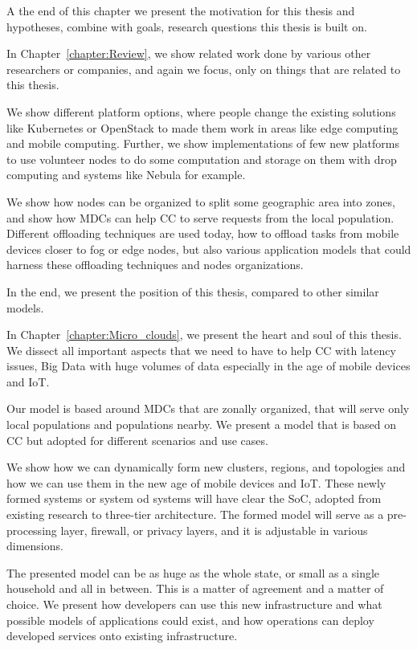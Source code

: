A the end of this chapter we present the motivation for this thesis and hypotheses, combine with goals, research questions this thesis is built on.

In Chapter~\ref{chapter:Review}, we show related work done by various other researchers or companies, and again we focus, only on things that are related to this thesis.

We show different platform options, where people change the existing solutions like Kubernetes or OpenStack to made them work in areas like edge computing and mobile computing. Further, we show implementations of few new platforms to use volunteer nodes to do some computation and storage on them with drop computing and systems like Nebula for example.

We show how nodes can be organized to split some geographic area into zones, and show how MDCs can help CC to serve requests from the local population. Different offloading techniques are used today, how to offload tasks from mobile devices closer to fog or edge nodes, but also various application models that could harness these offloading techniques and nodes organizations.

In the end, we present the position of this thesis, compared to other similar models.

In Chapter~\ref{chapter:Micro_clouds}, we present the heart and soul of this thesis. We dissect all important aspects that we need to have to help CC with latency issues, Big Data with huge volumes of data especially in the age of mobile devices and IoT.

Our model is based around MDCs that are zonally organized, that will serve only local populations and populations nearby. We present a model that is based on CC but adopted for different scenarios and use cases.

We show how we can dynamically form new clusters, regions, and topologies and how we can use them in the new age of mobile devices and IoT. These newly formed systems or system od systems will have clear the SoC, adopted from existing research to three-tier architecture. The formed model will serve as a pre-processing layer, firewall, or privacy layers, and it is adjustable in various dimensions.

The presented model can be as huge as the whole state, or small as a single household and all in between. This is a matter of agreement and a matter of choice. We present how developers can use this new infrastructure and what possible models of applications could exist, and how operations can deploy developed services onto existing infrastructure.

